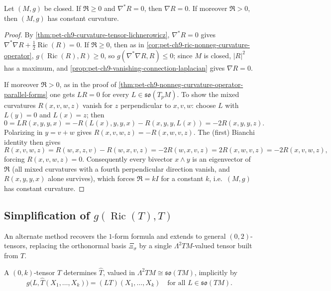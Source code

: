 \begin{theorem}
  \label{thm:pet-ch9-tachibana-parallel-curvature}
  Let $(M,g)$ be closed. If $\mathfrak{R}\ge0$ and $\nabla^*R=0$, then $\nabla R=0$.
  If moreover $\mathfrak{R}>0$, then $(M,g)$ has constant curvature.
\end{theorem}
\begin{proof}
  By \cref{thm:pet-ch9-curvature-tensor-lichnerowicz}, $\nabla^*R=0$ gives
  $\nabla^*\nabla R+\tfrac12\operatorname{Ric}(R)=0$. If $\mathfrak{R}\ge0$, then as in
  \cref{cor:pet-ch9-ric-nonneg-curvature-operator}, $g(\operatorname{Ric}(R),R)\ge0$, so
  $g(\nabla^*\nabla R,R)\le0$; since $M$ is closed, $|R|^2$ has a maximum, and
  \cref{prop:pet-ch9-vanishing-connection-laplacian} gives $\nabla R=0$.

  If moreover $\mathfrak{R}>0$, as in the proof of
  \cref{thm:pet-ch9-nonneg-curvature-operator-parallel-forms} one gets $LR=0$
  for every $L\in\mathfrak{so}(T_pM)$. To show the mixed curvatures
  $R(x,v,w,z)$ vanish for $z$ perpendicular to $x,v,w$: choose $L$ with
  $L(y)=0$ and $L(x)=z$; then
  \[
    0=LR(x,y,y,x)=-R(L(x),y,y,x)-R(x,y,y,L(x))=-2R(x,y,y,z).
  \]
  Polarizing in $y=v+w$ gives $R(x,v,w,z)=-R(x,w,v,z)$. The (first) Bianchi
  identity then gives
  \[
    R(x,v,w,z)=R(w,x,z,v)-R(w,x,v,z)=-2R(w,x,v,z)=2R(x,w,v,z)=-2R(x,v,w,z),
  \]
  forcing $R(x,v,w,z)=0$. Consequently every bivector $x\wedge y$ is an
  eigenvector of $\mathfrak{R}$ (all mixed curvatures with a fourth
  perpendicular direction vanish, and $R(x,y,y,x)$ alone survives), which
  forces $\mathfrak{R}=kI$ for a constant $k$, i.e.\ $(M,g)$ has constant
  curvature.
\end{proof}

\subsection{Simplification of $g(\operatorname{Ric}(T),T)$}

An alternate method recovers the $1$-form formula and extends to general
$(0,2)$-tensors, replacing the orthonormal basis $\Xi_\sigma$ by a single
$\Lambda^2TM$-valued tensor built from $T$.

\begin{definition}
  \label{def:pet-ch9-tensor-lambda2-valued}
  A $(0,k)$-tensor $T$ determines $\hat T$, valued in $\Lambda^2TM\cong
  \mathfrak{so}(TM)$, implicitly by
  \[
    g\big(L,\hat T(X_1,\dots,X_k)\big)=(LT)(X_1,\dots,X_k)\quad\text{for all }
    L\in\mathfrak{so}(TM).
  \]
\end{definition}

